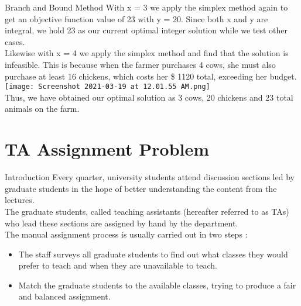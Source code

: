 \documentclass[9pt]{beamer}
\begin{document}
\begin{frame}{Branch and Bound Method}
With x = 3 we apply the simplex method again to get an objective function value of 23 with y = 20. Since both x and y are integral, we hold 23 as our current optimal integer solution while we test other cases.\\
\pause
Likewise with x = 4 we apply the simplex method and find that the solution is infeasible. This is because when the farmer purchases 4 cows, she must also purchase at least 16 chickens, which costs her \$ 1120 total, exceeding her budget.\\
\centering
\texttt{[image: Screenshot 2021-03-19 at 12.01.55 AM.png]}\\
\pause
Thus, we have obtained our optimal solution as 3 cows, 20 chickens and 23 total animals on the farm. 
\end{frame}

\section{TA Assignment Problem}

\begin{frame}{Introduction}
Every quarter, university students attend discussion sections led by graduate students in the hope of better understanding the content from the lectures.\\

\vspace{0.2cm}
The graduate students, called teaching assistants (hereafter referred to as TAs) who lead these sections are assigned by hand by the department.\\
\pause
\vspace{0.2cm}
The manual assignment process is usually carried out in two steps :
\begin{itemize}
    \item The staff surveys all graduate students to find out what classes they would prefer to teach and when they are unavailable to teach. 
    \item Match the graduate students to the available classes, trying to produce a fair and balanced assignment. 
\end{itemize}
\end{frame} 
\end{document}
